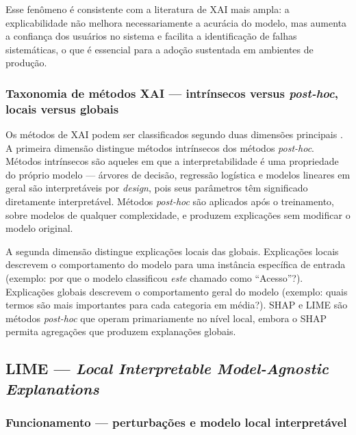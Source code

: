 \documentclass[
    12pt,                %
    openright,           %
    oneside,             %
    a4paper,             %
    english,             %
    brazil               %
]{abntex2}
\begin{document}
Esse fenômeno é consistente com a literatura de XAI mais ampla: a explicabilidade não melhora necessariamente a acurácia do modelo, mas aumenta a confiança dos usuários no sistema e facilita a identificação de falhas sistemáticas, o que é essencial para a adoção sustentada em ambientes de produção.

\subsubsection{Taxonomia de métodos XAI — intrínsecos versus \textit{post-hoc}, locais versus globais}
\label{subsubsec:xai_taxonomia}

Os métodos de XAI podem ser classificados segundo duas dimensões principais \cite{salih2023}. A primeira dimensão distingue métodos intrínsecos dos métodos \textit{post-hoc}. Métodos intrínsecos são aqueles em que a interpretabilidade é uma propriedade do próprio modelo — árvores de decisão, regressão logística e modelos lineares em geral são interpretáveis por \textit{design}, pois seus parâmetros têm significado diretamente interpretável. Métodos \textit{post-hoc} são aplicados após o treinamento, sobre modelos de qualquer complexidade, e produzem explicações sem modificar o modelo original.

A segunda dimensão distingue explicações locais das globais. Explicações locais descrevem o comportamento do modelo para uma instância específica de entrada (exemplo: por que o modelo classificou \textit{este} chamado como ``Acesso''?). Explicações globais descrevem o comportamento geral do modelo (exemplo: quais termos são mais importantes para cada categoria em média?). SHAP e LIME são métodos \textit{post-hoc} que operam primariamente no nível local, embora o SHAP permita agregações que produzem explanações globais.

\subsection{LIME — \textit{Local Interpretable Model-Agnostic Explanations}}
\label{subsec:lime}

\subsubsection{Funcionamento — perturbações e modelo local interpretável}
\label{subsubsec:lime_funcionamento}
\end{document}
